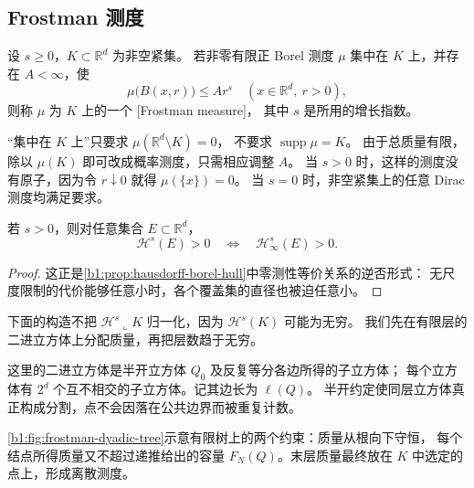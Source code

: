 \subsection{Frostman 测度}
\label{b1:subsec:150402}

\begin{definition}\label{b1:def:frostman-measure}
设 \(s\geq0\)，\(K\subset\mathbb R^d\) 为非空紧集。
若非零有限正 Borel 测度 \(\mu\) 集中在 \(K\) 上，并存在 \(A<\infty\)，使
\[
 \mu\bigl(B(x,r)\bigr)\leq A r^s
 \quad(x\in\mathbb R^d,\ r>0),
\]
则称 \(\mu\) 为 \(K\) 上的一个 [Frostman measure]，
其中 \(s\) 是所用的增长指数。
\end{definition}

“集中在 \(K\) 上”只要求 \(\mu(\mathbb R^d\setminus K)=0\)，
不要求 \(\operatorname{supp}\mu=K\)。
由于总质量有限，除以 \(\mu(K)\) 即可改成概率测度，只需相应调整 \(A\)。
当 \(s>0\) 时，这样的测度没有原子，因为令 \(r\downarrow0\) 就得 \(\mu(\{x\})=0\)。
当 \(s=0\) 时，非空紧集上的任意 Dirac 测度均满足要求。

\begin{lemma}\label{b1:lem:hausdorff-content-positive}
若 \(s>0\)，则对任意集合 \(E\subset\mathbb R^d\)，
\[
 \mathcal H^s(E)>0\quad\Longleftrightarrow\quad
 \mathcal H^s_\infty(E)>0.
\]
\end{lemma}
\begin{proof}
这正是\cref{b1:prop:hausdorff-borel-hull}中零测性等价关系的逆否形式：
无尺度限制的代价能够任意小时，各个覆盖集的直径也被迫任意小。
\end{proof}

下面的构造不把 \(\mathcal H^s\llcorner K\) 归一化，因为 \(\mathcal H^s(K)\) 可能为无穷。
我们先在有限层的二进立方体上分配质量，再把层数趋于无穷。

\ProseParagraphBreak

这里的二进立方体是半开立方体 \(Q_0\) 及反复等分各边所得的子立方体；
每个立方体有 \(2^d\) 个互不相交的子立方体。记其边长为 \(\ell(Q)\)。
半开约定使同层立方体真正构成分割，点不会因落在公共边界而被重复计数。

\ProseParagraphBreak

\cref{b1:fig:frostman-dyadic-tree}示意有限树上的两个约束：质量从根向下守恒，
每个结点所得质量又不超过递推给出的容量 \(F_N(Q)\)。末层质量最终放在
\(K\) 中选定的点上，形成离散测度。

